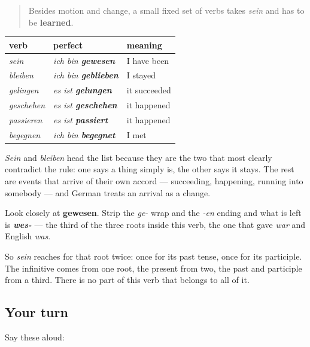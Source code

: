 \begin{grammarlens}[title={Grammar Lens: the verbs you simply learn}]
\begin{quote}
Besides motion and change, a small fixed set of verbs takes \emph{sein} and has to be \textbf{learned}.
\end{quote}

\noindent
\begin{tabularx}{\linewidth}{@{}>{\raggedright\arraybackslash}X>{\raggedright\arraybackslash}X>{\raggedright\arraybackslash}X@{}}
\toprule
\textbf{verb} & \textbf{perfect} & \textbf{meaning} \\
\midrule
\emph{sein} & \emph{ich bin \textbf{gewesen}} & I have been \\
\emph{bleiben} & \emph{ich bin \textbf{geblieben}} & I stayed \\
\emph{gelingen} & \emph{es ist \textbf{gelungen}} & it succeeded \\
\emph{geschehen} & \emph{es ist \textbf{geschehen}} & it happened \\
\emph{passieren} & \emph{es ist \textbf{passiert}} & it happened \\
\emph{begegnen} & \emph{ich bin \textbf{begegnet}} & I met \\
\bottomrule
\end{tabularx}

\emph{Sein} and \emph{bleiben} head the list because they are the two that most clearly contradict the rule: one says a thing simply is, the other says it stays. The rest are events that arrive of their own accord — succeeding, happening, running into somebody — and German treats an arrival as a change.
\end{grammarlens}

\begin{cousinweb}
Look closely at \textbf{gewesen}. Strip the \emph{ge-} wrap and the \emph{-en} ending and what is left is \emph{\textbf{wes-}} — the third of the three roots inside this verb, the one that gave \emph{war} and English \emph{was}.

So \emph{sein} reaches for that root twice: once for its past tense, once for its participle. The infinitive comes from one root, the present from two, the past and participle from a third. There is no part of this verb that belongs to all of it.
\end{cousinweb}

\subsection*{Your turn}
Say these aloud:


